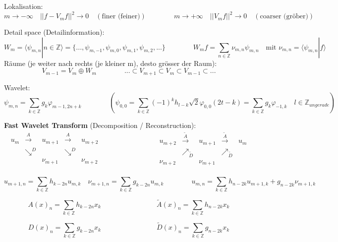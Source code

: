 Lokalisation:
\[  
	m \rightarrow -\infty \quad ||f-V_mf||^2 \rightarrow 0 \quad (\text{finer (feiner)})
	\qquad \qquad
	m \rightarrow +\infty \quad ||V_mf||^2 \rightarrow 0 \quad (\text{coarser (gröber)})
\]

Detail space (Detailinformation):
\[
	W_m = \langle \psi_{m,n} | n \in \mathbb{Z} \rangle = \{ ...,\psi_{m,-1},\psi_{m,0}, \psi_{m,1}, \psi_{m,2},... \}
	\qquad \qquad
	W_mf = \sum_{n \in \mathbb{Z}} \nu_{m,n}\psi_{m,n} \quad \text{mit } \nu_{m,n}=\langle \psi_{m,n}|f \rangle
\]
Räume (je weiter nach rechts (je kleiner m), desto grösser der Raum):
\[ V_{m-1} = V_m \oplus W_m  \qquad \qquad ...\subset V_{m+1} \subset V_{m} \subset V_{m-1} \subset ... \]

Wavelet:
\[
	\psi_{m,n} = \sum_{k \in \mathbb{Z}} g_k \varphi_{m-1,2n+k} 
	\qquad \qquad 
	\left(\psi_{0,0}=\sum_{k \in \mathbb{Z}} (-1)^k h_{l-k} \sqrt{2}  \varphi_{0,0}(2t-k) = \sum_{k \in \mathbb{Z}} g_k \varphi_{-1,k} \quad l \in \mathbb{Z}_{ungerade} \right)
\]

\textbf{Fast Wavelet Transform} (Decomposition / Reconstruction):
\[
	\boxed{\begin{array}{ccccc}
		u_m & \xrightarrow{A} & u_{m+1} & \xrightarrow{A} & u_{m+2} \\
		& \searrow^{D} & & \searrow^{D} & \\
		& & \nu_{m+1} & & \nu_{m+2} \\
	\end{array}}
	\qquad \qquad \qquad \qquad
	\boxed{\begin{array}{ccccc}
		u_{m+2} & \xrightarrow{\tilde{A}} & u_{m+1} & \xrightarrow{\tilde{A}} & u_{m} \\
		& \nearrow_{\tilde{D}} & & \nearrow_{\tilde{D}} & \\
		\nu_{m+2}& & \nu_{m+1} & & \\
	\end{array}}
\]

\[  
	u_{m+1,n} = \sum_{k \in  \mathbb{Z}} h_{k-2n} u_{m,k} \quad \nu_{m+1,n} = \sum_{k \in  \mathbb{Z}} g_{k-2n} u_{m,k}
	\qquad \qquad
	u_{m,n} = \sum_{k \in  \mathbb{Z}} h_{n-2k} u_{m+1,k} + g_{n-2k} \nu_{m+1,k}
\]

\[
	A(x)_n = \sum_{k \in  \mathbb{Z}} h_{k-2n} x_k
	\qquad \qquad \qquad \qquad
	\tilde{A}(x)_n = \sum_{k \in  \mathbb{Z}} h_{n-2k} x_k
\]

\[
	D(x)_n = \sum_{k \in  \mathbb{Z}} g_{k-2n} x_k
	\qquad \qquad \qquad \qquad
	\tilde{D}(x)_n = \sum_{k \in  \mathbb{Z}} g_{n-2k} x_k
\]


